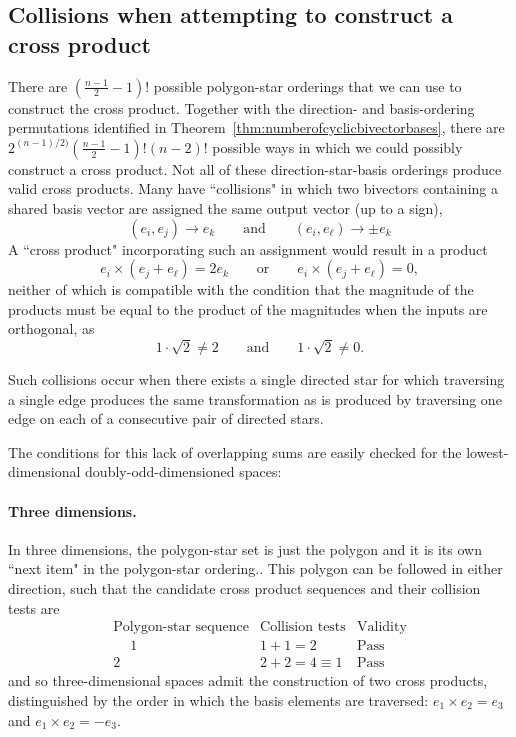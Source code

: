 \documentclass[11pt]{article}
\newcommand{\bv}[1][]{e_{#1}}
\newcommand{\bp}[2]{(#1,#2)}
\begin{document}
\subsection{Collisions when attempting to construct a cross product}
There are $ (\frac{n-1}{2} -1)! $ possible polygon-star orderings that we can use to construct the cross product. Together with the direction- and basis-ordering permutations identified in Theorem~\ref{thm:numberofcyclicbivectorbases}, there are $2^{(n-1)/2)} (\frac{n-1}{2} -1)!  (n-2)!$ possible ways in which we could possibly construct a cross product.
Not all of these  direction-star-basis orderings produce valid cross products. Many have ``collisions" in which two bivectors containing a shared basis vector are assigned the same output vector (up to a sign),
%
\begin{equation}
\bp{\bv[i]}{\bv[j]} \rightarrow \bv[k] \qquad \mathrm{and} \qquad \bp{\bv[i]}{\bv[\ell]} \rightarrow \pm\bv[k] 
\end{equation}
%
A ``cross product" incorporating such an assignment would result in a product
%
\begin{equation}
\bv[i] \times (\bv[j]+\bv[\ell]) = 2 \bv[k] \qquad \mathrm{or} \qquad \bv[i] \times (\bv[j]+\bv[\ell]) = 0,
\end{equation}
neither of which is compatible with the condition that the magnitude of the products must be equal to the product of the magnitudes when the inputs are orthogonal, as
\begin{equation} 
1 \cdot \sqrt{2} \neq 2 \qquad \mathrm{and} \qquad 1 \cdot \sqrt{2} \neq 0 .
\end{equation}


Such collisions occur when there exists a single directed star for which traversing a single edge produces the same transformation as is produced by traversing one edge on each of a consecutive pair of directed stars.

The conditions for this lack of overlapping sums are easily checked for the lowest-dimensional doubly-odd-dimensioned spaces:

\paragraph{Three dimensions.} In three dimensions, the polygon-star set is just the polygon and it is its own ``next item" in the polygon-star ordering.. This polygon can be followed in either direction, such that the candidate cross product sequences and their collision tests are
\begin{equation}
\begin{array}{c|c|c}
\text{Polygon-star sequence} & \text{Collision tests} & \text{Validity} \\\hline\hline
\phantom{-}1 & 1+1 = 2 & \text{Pass} \\
2 & 2 + 2 = 4 \equiv 1 &  \text{Pass}
\end{array}
\end{equation}
%
and so three-dimensional spaces admit the construction of two cross products, distinguished by the order in which the basis elements are traversed: $\bv[1]\times\bv[2]=\bv[3]$ and $\bv[1]\times\bv[2]=-\bv[3]$.
\end{document}
